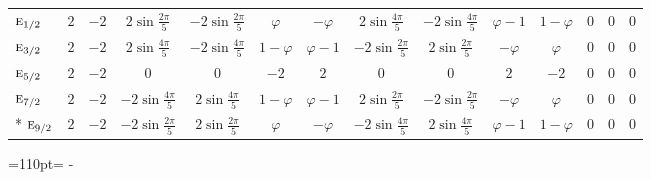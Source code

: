 \documentclass[10pt,a4paper]{article}
\makeatletter
\def\grouprule#1#2{\noalign{\marks\LTgroupmarks{\the\belowrulesep}\nobreak\vskip#1%
  \vskip\aboverulesep}\multispan\LT@cols\unskip{\leaders\hrule\@height#2\hfill\kern\z@}\cr
  \noalign{\penalty\LTrulebreak\vskip\belowrulesep\global\@lastruleclass\z@}}
\newcommand{\needspace}[1]{\par\penalty-100\begingroup\dimen0=#1\relax\dimen2=\pagegoal
  \advance\dimen2-\pagetotal\ifdim\dimen0>\dimen2\relax\ifdim\dimen2>0pt\vfil\break\fi\fi
  \endgroup}
\numberwithin{equation}{section}
\newcommand{\irr}[1]{\text{\normalfont\scshape #1}}
\newcommand{\goldenratio}{\varphi}
\makeatother
\begin{document}
{{\begin{longtable}{@{}lccccccccccccc@{}}
\grouprule{0pt}{\lightrulewidth}
$\irr{e}_{1/2}$ & $2$ & $-2$ & $2\sin\tfrac{2\pi}{5}$ & $-2\sin\tfrac{2\pi}{5}$ & $\goldenratio{}$ & $-\goldenratio{}$ & $2\sin\tfrac{4\pi}{5}$ & $-2\sin\tfrac{4\pi}{5}$ & $\goldenratio - 1$ & $1 - \goldenratio{}$ & $0$ & $0$ & $0$\\
$\irr{e}_{3/2}$ & $2$ & $-2$ & $2\sin\tfrac{4\pi}{5}$ & $-2\sin\tfrac{4\pi}{5}$ & $1 - \goldenratio{}$ & $\goldenratio - 1$ & $-2\sin\tfrac{2\pi}{5}$ & $2\sin\tfrac{2\pi}{5}$ & $-\goldenratio{}$ & $\goldenratio{}$ & $0$ & $0$ & $0$\\
$\irr{e}_{5/2}$ & $2$ & $-2$ & $0$ & $0$ & $-2$ & $2$ & $0$ & $0$ & $2$ & $-2$ & $0$ & $0$ & $0$\\
$\irr{e}_{7/2}$ & $2$ & $-2$ & $-2\sin\tfrac{4\pi}{5}$ & $2\sin\tfrac{4\pi}{5}$ & $1 - \goldenratio{}$ & $\goldenratio - 1$ & $2\sin\tfrac{2\pi}{5}$ & $-2\sin\tfrac{2\pi}{5}$ & $-\goldenratio{}$ & $\goldenratio{}$ & $0$ & $0$ & $0$\\*
$\irr{e}_{9/2}$ & $2$ & $-2$ & $-2\sin\tfrac{2\pi}{5}$ & $2\sin\tfrac{2\pi}{5}$ & $\goldenratio{}$ & $-\goldenratio{}$ & $-2\sin\tfrac{4\pi}{5}$ & $2\sin\tfrac{4\pi}{5}$ & $\goldenratio - 1$ & $1 - \goldenratio{}$ & $0$ & $0$ & $0$\\
\bottomrule\end{longtable}}}
\needspace{110pt}
\end{document}
